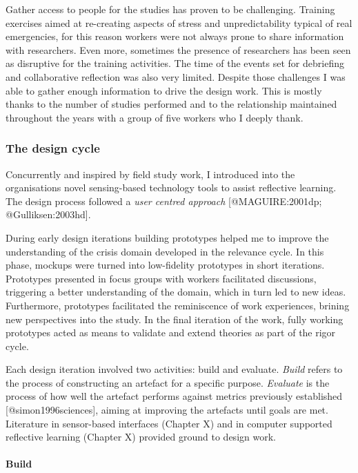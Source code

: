 Gather access to people for the studies has proven to be challenging.
Training exercises aimed at re-creating aspects of stress and
unpredictability typical of real emergencies, for this reason workers
were not always prone to share information with researchers. Even more,
sometimes the presence of researchers has been seen as disruptive for
the training activities. The time of the events set for debriefing and
collaborative reflection was also very limited. Despite those challenges
I was able to gather enough information to drive the design work. This
is mostly thanks to the number of studies performed and to the
relationship maintained throughout the years with a group of five
workers who I deeply
thank.

\subsubsection{The design cycle}\label{the-design-cycle}

Concurrently and inspired by field study work, I introduced into the
organisations novel sensing-based technology tools to assist reflective
learning. The design process followed a \emph{user centred approach}
{[}@MAGUIRE:2001dp; @Gulliksen:2003hd{]}.

During early design iterations building prototypes helped me to improve
the understanding of the crisis domain developed in the relevance cycle.
In this phase, mockups were turned into low-fidelity prototypes in short
iterations. Prototypes presented in focus groups with workers
facilitated discussions, triggering a better understanding of the
domain, which in turn led to new ideas. Furthermore, prototypes
facilitated the reminiscence of work experiences, brining new
perspectives into the study. In the final iteration of the work, fully
working prototypes acted as means to validate and extend theories as
part of the rigor cycle.

Each design iteration involved two activities: build and evaluate.
\emph{Build} refers to the process of constructing an artefact for a
specific purpose. \emph{Evaluate} is the process of how well the
artefact performs against metrics previously established
{[}@simon1996sciences{]}, aiming at improving the artefacts until goals
are met. Literature in sensor-based interfaces (Chapter X) and in
computer supported reflective learning (Chapter X) provided ground to
design work.

\paragraph{Build}\label{build}


